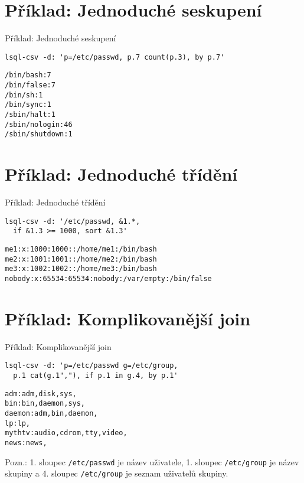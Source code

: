 \documentclass{beamer}
\def\icode#1{\texttt{#1}}
\begin{document}
\section{Příklad: Jednoduché seskupení}
\begin{frame}[fragile]{Příklad: Jednoduché seskupení}
\begin{verbatim}
lsql-csv -d: 'p=/etc/passwd, p.7 count(p.3), by p.7'
\end{verbatim}

\begin{verbatim}
/bin/bash:7
/bin/false:7
/bin/sh:1
/bin/sync:1
/sbin/halt:1
/sbin/nologin:46
/sbin/shutdown:1
\end{verbatim}
\end{frame}


\section{Příklad: Jednoduché třídění}
\begin{frame}[fragile]{Příklad: Jednoduché třídění}
\begin{verbatim}
lsql-csv -d: '/etc/passwd, &1.*, 
  if &1.3 >= 1000, sort &1.3'
\end{verbatim}

\begin{verbatim}
me1:x:1000:1000::/home/me1:/bin/bash
me2:x:1001:1001::/home/me2:/bin/bash
me3:x:1002:1002::/home/me3:/bin/bash
nobody:x:65534:65534:nobody:/var/empty:/bin/false
\end{verbatim}
\end{frame}


\section{Příklad: Komplikovanější join}
\begin{frame}[fragile]{Příklad: Komplikovanější join}
\begin{verbatim}
lsql-csv -d: 'p=/etc/passwd g=/etc/group, 
  p.1 cat(g.1","), if p.1 in g.4, by p.1'
\end{verbatim}

\begin{verbatim}
adm:adm,disk,sys,
bin:bin,daemon,sys,
daemon:adm,bin,daemon,
lp:lp,
mythtv:audio,cdrom,tty,video,
news:news,
\end{verbatim}

\vskip 1cm

Pozn.: 1. sloupec \icode{/etc/passwd} je název uživatele, 1. sloupec \icode{/etc/group} je název skupiny a 
4. sloupec \icode{/etc/group} je seznam uživatelů skupiny.

\end{frame}
\end{document}
